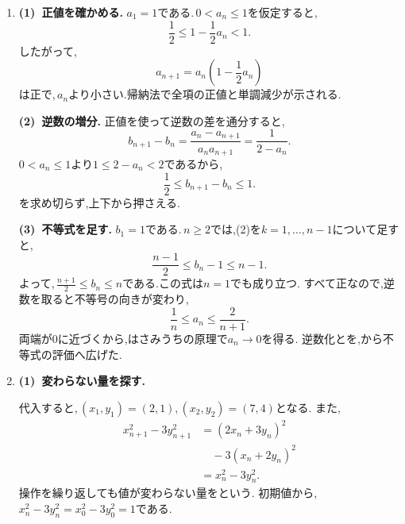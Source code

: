 \begin{enumerate}[label=\textbf{問\arabic*.},leftmargin=3.8em,format=\bookitemlink{practice-bridge}{solution}{problem}]
                \noindent \textbf{【別解】}\\
                先に食塩の総量が変わらないことを使い,\,$\displaystyle y_n=10-x_n$を代入すると,
                \[
                  x_{n+1}=\frac12x_n+\frac52
                \]
                となる.$\displaystyle 5$を引けば,同じ答えが得られる.
          \item \textbf{(1)~正値を確かめる.}
                $\displaystyle a_1=1$である.\,$\displaystyle 0<a_n\le1$を仮定すると,
                \[
                  \frac12\le1-\frac12a_n<1.
                \]
                したがって,
                \[
                  a_{n+1}=a_n\left(1-\frac12a_n\right)
                \]
                は正で,\,$\displaystyle a_n$より小さい.帰納法で全項の正値と単調減少が示される.

                \smallskip
                \textbf{(2)~逆数の増分.}
                正値を使って逆数の差を通分すると,
                \[
                  b_{n+1}-b_n
                    =\frac{a_n-a_{n+1}}{a_na_{n+1}}
                    =\frac1{2-a_n}.
                \]
                $\displaystyle 0<a_n\le1$より$\displaystyle 1\le2-a_n<2$であるから,
                \[
                  \frac12\le b_{n+1}-b_n\le1.
                \]
                を求め切らず,上下から押さえる.

                \smallskip
                \textbf{(3)~不等式を足す.}
                $\displaystyle b_1=1$である.\,$\displaystyle n\ge2$では,(2)を$\displaystyle k=1,\ldots,n-1$について足すと,
                \[
                  \frac{n-1}{2}\le b_n-1\le n-1.
                \]
                よって,\,$\displaystyle \frac{n+1}{2}\le b_n\le n$である.この式は$\displaystyle n=1$でも成り立つ.
                すべて正なので,逆数を取ると不等号の向きが変わり,
                \[
                  \frac1n\le a_n\le\frac2{n+1}.
                \]
                両端が$\displaystyle 0$に近づくから,はさみうちの原理で$\displaystyle a_n\to0$を得る.
                逆数化とを,から不等式の評価へ広げた.
          \item \textbf{(1)~変わらない量を探す.}\par\nobreak
                代入すると,\,$\displaystyle (x_1,y_1)=(2,1),(x_2,y_2)=(7,4)$となる.
                また,
                \begin{align*}
                  x_{n+1}^2-3y_{n+1}^2
                    &=(2x_n+3y_n)^2\\
                    &\quad-3(x_n+2y_n)^2\\
                    &=x_n^2-3y_n^2.
                \end{align*}
                操作を繰り返しても値が変わらない量を\textbf{}という.
                初期値から,\,$\displaystyle x_n^2-3y_n^2=x_0^2-3y_0^2=1$である.


\end{enumerate}
